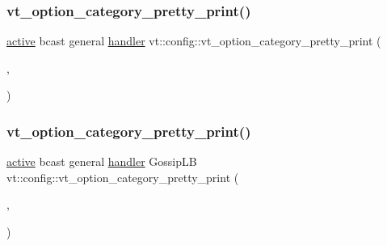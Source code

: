 \subsubsection{\texorpdfstring{vt\+\_\+option\+\_\+category\+\_\+pretty\+\_\+print()}{vt\_option\_category\_pretty\_print()}\hspace{0.1cm}{\footnotesize\ttfamily [5/16]}}
{\footnotesize\ttfamily \hyperlink{namespacevt_1_1config_a6bd1d6215bda0d8ca02811798399f689a82f77c67af0c363709010c6df4dbd920}{active} bcast general \hyperlink{namespacevt_1_1config_a6bd1d6215bda0d8ca02811798399f689a82a0081a94d5c5dfd18b0b3f7eca64b7}{handler} vt\+::config\+::vt\+\_\+option\+\_\+category\+\_\+pretty\+\_\+print (\begin{DoxyParamCaption}\item[{\hyperlink{namespacevt_1_1config_a6bd1d6215bda0d8ca02811798399f689a130f5ad6dc3e35d09be7ee3581b07175}{hierlb}}]{,  }\item[{\char`\"{}Hierarchical\+LB\char`\"{}}]{ }\end{DoxyParamCaption})}

\mbox{\label{namespacevt_1_1config_a608d5922ee8eb1103a14e84fd48f3f4e}} 
\subsubsection{\texorpdfstring{vt\+\_\+option\+\_\+category\+\_\+pretty\+\_\+print()}{vt\_option\_category\_pretty\_print()}\hspace{0.1cm}{\footnotesize\ttfamily [6/16]}}
{\footnotesize\ttfamily \hyperlink{namespacevt_1_1config_a6bd1d6215bda0d8ca02811798399f689a82f77c67af0c363709010c6df4dbd920}{active} bcast general \hyperlink{namespacevt_1_1config_a6bd1d6215bda0d8ca02811798399f689a82a0081a94d5c5dfd18b0b3f7eca64b7}{handler} Gossip\+LB vt\+::config\+::vt\+\_\+option\+\_\+category\+\_\+pretty\+\_\+print (\begin{DoxyParamCaption}\item[{\hyperlink{namespacevt_1_1config_a6bd1d6215bda0d8ca02811798399f689aecb25779c74e06cc3e6baf03ed8289ed}{lb}}]{,  }\item[{\char`\"{}lb\char`\"{}}]{ }\end{DoxyParamCaption})}

